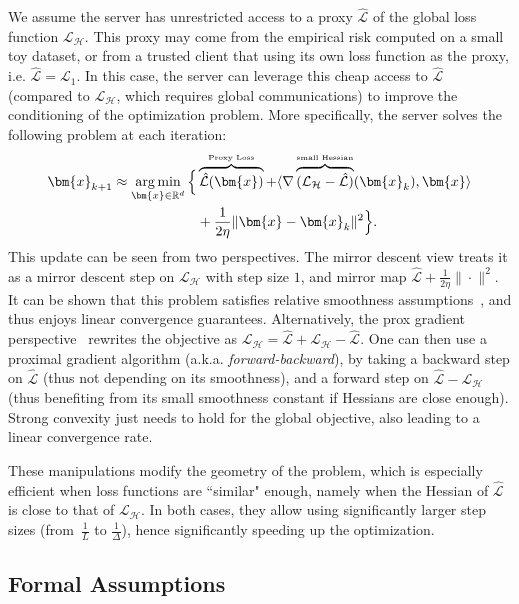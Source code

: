 \documentclass{article}
\def\vx{{\bm{x}}}
\newcommand{\R}{\mathbb{R}}
\DeclareMathOperator*{\argmin}{arg\,min}
\newcommand{\cH}{\mathcal{H}}
\newcommand{\cL}{\mathcal{L}}
\theoremstyle{plain}
\theoremstyle{definition}
\theoremstyle{remark}
\begin{document}
We assume the server has unrestricted access to a proxy $\hat{\cL}$ of the global loss function $\cL_{\cH}$. This proxy may come from the empirical risk computed on a small toy dataset, or from a trusted client that using its own loss function as the proxy, i.e. $\hat{\cL} = \cL_1$. In this case, the server can leverage this cheap access to $\hat{\cL}$ (compared to $\cL_{\cH}$, which requires global communications) to improve the conditioning of the optimization problem. More specifically, the server solves the following problem at each iteration:
\begin{align}
    \label{eq:prox_update}
    \vx_{k+1} \approx \argmin_{\vx \in \R^d} \Big\{ &\overbrace{\hat{\cL}(\vx)}^{\text{\tiny Proxy Loss}} +  \langle \nabla\overbrace{(\cL_{\cH} - \hat{\cL})}^{\text{\tiny small Hessian}}(\vx_k), \vx \rangle \notag\\ 
    &+ \frac{1}{2\eta}\|\vx - \vx_k\|^2\Big\}.
\end{align}
This update can be seen from two perspectives. The mirror descent view \citep{shamir2014communication,hendrikx2020statistically} treats it as a mirror descent step on $\cL_{\cH}$ with step size $1$, and mirror map $\hat{\cL} + \frac{1}{2\eta}\| \cdot\|^2$. It can be shown that this problem satisfies relative smoothness assumptions~\citep{bauschke2017descent}, and thus enjoys linear convergence guarantees. Alternatively, the prox gradient perspective~\citep{kovalev2020optimal, woodworth2023two} rewrites the objective as $\cL_{\cH} = \hat{\cL} + \cL_{\cH} - \hat{\cL}$. %
One can then use a proximal gradient algorithm (a.k.a. \emph{forward-backward}), by taking a backward step on $\hat{\cL}$ (thus not depending on its smoothness), and a forward step on $\hat{\cL} - \cL_{\cH}$ (thus benefiting from its small smoothness constant if Hessians are close enough). Strong convexity just needs to hold for the global objective, also leading to a linear convergence rate. 

These manipulations modify the geometry of the problem, which is especially efficient when loss functions are ``similar" enough, namely when the Hessian of $\hat{\cL}$ is close to that of $\cL_{\cH}$. In both cases, they allow using significantly larger step sizes (from~$\frac{1}{L}$ to $\frac{1}{\Delta}$), hence significantly speeding up the optimization.

\subsection{Formal Assumptions}
\end{document}
